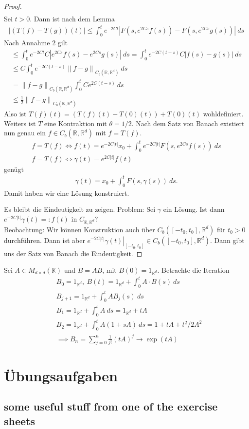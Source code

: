 \documentclass[11pt,twoside]{memoir}
\newcommand{\norm}[1]{\left\lVert#1\right\rVert}
\begin{document}
\begin{proof}
\begin{align*}
	\end{align*}
	Sei $t>0$. Dann ist nach dem Lemma
	\begin{align*}
		\left| (T(f) - T(g))(t)\right| \leq \int_0^t e^{-2Ct} \left| F(s, e^{2Cs}f(s)) - F(s,e^{2Cs}g(s))\right|~ds
	\end{align*}
	Nach Annahme 2 gilt
	\begin{align*}
		\leq \int_0^t e^{-2Ct}C\left| e^{2Cs}f(s)- e^{2Cs}g(s)\right|~ds = \int_0^te^{-2C(t-s)}C|f(s)-g(s)|~ds\\
		\leq C \int_0^t e^{-2C(t-s)} \norm{f-g}_{C_b(\mathbb{R},\mathbb{R}^d)}~ds\\
		= \norm{f-g}_{C_b(\mathbb{R},\mathbb{R}^d)} \int_0^tCe^{2C(t-s)}~ds\\
		\leq \frac{1}{2} \norm{f-g}_{C_b(\mathbb{R},\mathbb{R}^d)}
	\end{align*}
	Also ist $T(f)(t) = (T(f)(t) - T(0)(t)) + T(0)(t)$ wohldefiniert.\\
	Weiters ist $T$ eine Kontraktion mit $\theta = 1/2$. Nach dem Satz von Banach existiert nun genau ein $f\in C_b(\mathbb{R},\mathbb{R}^d)$ mit $f = T(f)$.
	\begin{align*}
		f = T(f) \Longleftrightarrow f(t) = e^{-2C|t|}x_0 + \int_0^te^{-2C|t|}F(s,e^{2Cs}f(s))~ds\\
		f = T(f) \Longleftrightarrow \gamma(t) = e^{2C|t|}f(t)
	\end{align*}
	genügt
	\begin{align*}
		\gamma(t) = x_0 + \int_0^t F(s,\gamma(s))~ds.
	\end{align*}
	Damit haben wir eine Lösung konstruiert.\par
	Es bleibt die Eindeutigkeit zu zeigen. Problem: Sei $\gamma$ ein Lösung. Ist dann $e^{-2C|t|}\gamma(t) =: f(t)$ in $C_{\mathbb{R},\mathbb{R}^d}$?\\
	Beobachtung: Wir können Konstruktion auch über $C_b([-t_0,t_0],\mathbb{R}^d)$ für $t_0 >0$ durchführen. Dann ist aber $\left.e^{-2C|t|}\gamma(t)\right|_{[-t_0,t_0]} \in C_b([-t_0,t_0],\mathbb{R}^d)$. Dann gibt uns der Satz von Banach die Eindeutigkeit.
\end{proof}
\begin{bsp}
	Sei $A\in M_{d\times d}(\mathbb{K})$ und $\dot{B} = AB$, mit $B(0) = 1_{\mathbb{R}^d}$. Betrachte die Iteration
	\begin{align*}
		& B_0 = 1_{\mathbb{R}^d},~B(t) = 1_{\mathbb{R}^d} + \int_0^t A\cdot B(s)~ds\\
		& B_{j+1} = 1_{\mathbb{R}^d} + \int_0^tAB_{j}(s)~ds\\
		& B_{1} = 1_{\mathbb{R}^d} + \int_0^t A~ds = 1_{\mathbb{R}^d} + tA\\
		& B_2 = 1_{\mathbb{R}^d}  + \int_0^t A(1+sA)~ds = 1 + tA + t^2/2A^2\\
		& \implies B_n =  \sum_{j=0}^n \frac{1}{j!}(tA)^j \to \exp(tA)
	\end{align*}
\end{bsp}



\appendix
\chapter{Übungsaufgaben}
\section{some useful stuff from one of the exercise sheets}
\backmatter
\printbibliography[heading = bibintoc]
\printindex
\end{document}
